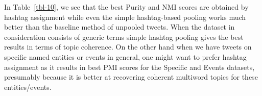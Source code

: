 \documentclass{sig-alternate}
\begin{document}
In Table~\ref{tbl-10}, we see that the best Purity and NMI scores are obtained by hashtag assignment while even the simple hashtag-based pooling works much better than the baseline method of unpooled tweets. When the dataset in consideration consists of generic terms simple hashtag pooling gives the best results in terms of topic coherence. On the other hand when we have tweets on specific named entities or events in general, one might want to prefer hashtag assignment as it results in best PMI scores for the Specific and Events datasets, presumably because it is better at recovering coherent multiword topics for these entities/events.



\end{document}
